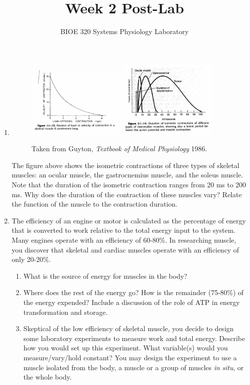 \documentclass{article}
\title{Week 2 Post-Lab}
\author{BIOE 320 Systems Physiology Laboratory}
\date{}
\begin{document}
\maketitle
\large

\begin{enumerate}
	\item
		\begin{figure}[h]
	\includegraphics[width=0.45\textwidth]{../images/EMG_1_12a.jpg}
	\includegraphics[width=0.45\textwidth]{../images/EMG_1_12b.jpg}
		\centering
		\caption{Taken from Guyton, \textit{Textbook of Medical Physiology} 1986.}
		\label{muscles}
\end{figure}
	
	The figure above shows the isometric contractions of three types of skeletal muscles: an ocular muscle, the gastrocnemius muscle, and the soleus muscle. Note that the duration of the isometric contraction ranges from 20 ms to 200 ms. Why does the duration of the contraction of these muscles vary? Relate the function of the muscle to the contraction duration.
	\item The efficiency of an engine or motor is calculated as the percentage of energy that is converted to work relative to the total energy input to the system. Many engines operate with an efficiency of 60-80\%. In researching muscle, you discover that skeletal and cardiac muscles operate with an efficiency of only 20-20\%.
		\begin{enumerate}
			\item What is the source of energy for muscles in the body?
			\item Where does the rest of the energy go? How is the remainder (75-80\%) of the energy expended? Include a discussion of the role of ATP in energy transformation and storage.
			\item Skeptical of the low efficiency of skeletal muscle, you decide to design some laboratory experiments to measure work and total energy. Describe how you would set up this experiment. What variable(s) would you measure/vary/hold constant? You may design the experiment to use a muscle isolated from the body, a muscle or a group of muscles \textit{in situ}, or the whole body.
		\end{enumerate}
\end{enumerate}
\end{document}
